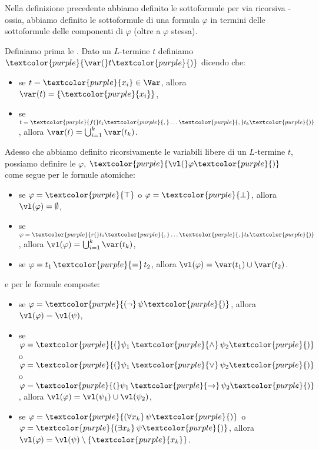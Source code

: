 Nella definizione precedente abbiamo definito le sottoformule per via ricorsiva - ossia, abbiamo definito le sottoformule di una formula $\varphi$ in termini delle sottoformule delle componenti di $\varphi$ (oltre a $\varphi$ stessa).

\begin{definition}
    Definiamo prima le . Dato un $L$-termine $t$ definiamo $\textcolor{purple}{\var(} t \textcolor{purple}{)}$ dicendo che:
    \begin{itemize}
        \item se $t = \textcolor{purple}{x_i} \in \Var$, allora $\var(t) = \{\textcolor{purple}{x_i}\}$,
        \item se $t = \textcolor{purple}{f(}t_1\textcolor{purple}{,} \ldots\textcolor{purple}{,} t_k\textcolor{purple}{)}$, allora $\var(t) = \bigcup_{i = 1}^k \var(t_k)$.
    \end{itemize}
    Adesso che abbiamo definito ricorsivamente le variabili libere di un $L$-termine $t$, possiamo definire le  $\varphi$, $\textcolor{purple}{\vl(} \varphi \textcolor{purple}{)}$ come segue per le formule atomiche:
    \begin{itemize}
        \item se $\varphi = \textcolor{purple}{\top}$ o $\varphi = \textcolor{purple}{\bot}$, allora $\vl(\varphi) = \emptyset$,
        \item se $\varphi = \textcolor{purple}{r(} t_1\textcolor{purple}{,} \ldots\textcolor{purple}{,} t_k\textcolor{purple}{)}$, allora $\vl(\varphi) = \bigcup_{i = 1}^k \var(t_k)$,
        \item se $\varphi = t_1\, \textcolor{purple}{=}\, t_2$, allora $\vl(\varphi) = \var(t_1) \cup \var(t_2)$.
    \end{itemize}
    e per le formule composte:
    \begin{itemize}
        \item se $\varphi = \textcolor{purple}{(\neg}\, \psi \textcolor{purple}{)}$, allora $\vl(\varphi) = \vl(\psi)$,
        \item se $\varphi = \textcolor{purple}{(} \psi_1 \,\textcolor{purple}{\land} \,\psi_2 \textcolor{purple}{)}$ o $\varphi = \textcolor{purple}{(} \psi_1\, \textcolor{purple}{\lor}\, \psi_2 \textcolor{purple}{)}$ o $\varphi = \textcolor{purple}{(} \psi_1\, \textcolor{purple}{\to} \,\psi_2 \textcolor{purple}{)}$, allora $\vl(\varphi) = \vl(\psi_1) \cup \vl(\psi_2)$,
        \item se $\varphi = \textcolor{purple}{(\forall x_k} \,\psi \textcolor{purple}{)}$ o $\varphi = \textcolor{purple}{(\exists x_k}\, \psi \textcolor{purple}{)}$, allora $\vl(\varphi) = \vl(\psi) \setminus \{\textcolor{purple}{x_k}\}$.
    \end{itemize}
\end{definition}

